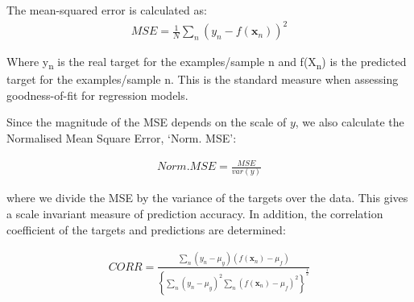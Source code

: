
The mean-squared error is calculated as:
\begin{equation}
\begin{aligned}
MSE=\frac{1}{N}\sum_{n} (y_n-f(\mathbf{x}_n))^2
\end{aligned}
\end{equation}

Where y\textsubscript{n} is the real target for the examples/sample n and f(X\textsubscript{n}) is the predicted target for the examples/sample n.
This is the standard measure when assessing goodness-of-fit for regression models.


Since the magnitude of the MSE depends on the scale of $y$, we also calculate the Normalised Mean Square Error, `Norm. MSE':

\begin{equation}
\begin{aligned}
Norm. MSE=\frac{MSE}{var(y)}
\end{aligned}
\end{equation}

where we divide the MSE by the variance of the targets over the 
data. This gives a scale invariant measure of prediction accuracy. In addition, the correlation coefficient of the targets and predictions are determined:

\begin{equation}
\begin{aligned}
CORR=\frac{\sum_{n} (y_n-\mu_y) (f(\boldsymbol{x}_n)-\mu_f)}{\left\{\sum_{n} (y_n-\mu_y)^2 \sum_{n} (f(\boldsymbol{x}_n)-\mu_f)^2\right\}^\frac{1}{2}}
\end{aligned}
\end{equation}

